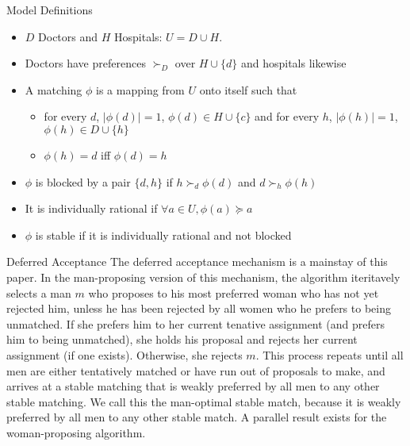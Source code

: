 \documentclass{beamer}
\begin{document}
\begin{frame}{Model Definitions}
	\begin{itemize}
		\item  $D$ Doctors and $H$ Hospitals: $U = D \cup H$.  
		\item Doctors have preferences $\succ_{D}$ over $H \cup \{d\}$ and hospitals likewise
		\item A matching $\phi$ is a mapping from $U$ onto itself such that 
		\begin{itemize}
			\item for every $d$, $|\phi(d)| = 1$, $\phi(d) \in H \cup \{c\} $ and for every  $h$, $|\phi(h)| = 1$, $\phi(h) \in D \cup \{h\}$
			\item $\phi(h) = d$ iff $\phi(d) = h$
		\end{itemize}
	\item $\phi$ is blocked by a pair $\{d,h\}$ if $h \succ_d \phi(d)$ and $d \succ_h \phi(h)$ 
	\item It is individually rational if $\forall a \in U ,\phi(a) \succeq a$ 
	\item $\phi$ is stable if it is individually rational and not blocked
	\end{itemize}
\end{frame}
\begin{frame}{Deferred Acceptance}
	The deferred acceptance mechanism is a mainstay of this paper. In the man-proposing version of this mechanism, the algorithm iteritavely selects a man $m$ who proposes to his most preferred woman who has not yet rejected him, unless he has been rejected by all women who he prefers to being unmatched.  If she prefers him to her current tenative assignment (and prefers him to being unmatched), she holds his proposal and rejects her current assignment (if one exists). Otherwise, she rejects $m$.  This process repeats until all men are either tentatively matched or have run out of proposals to make, and arrives at a stable matching that is weakly preferred by all men to any other stable matching.  We call this the man-optimal stable match, because it is weakly preferred by all men to any other stable match.  A parallel result exists for the woman-proposing algorithm.

\end{frame}
\end{document}
